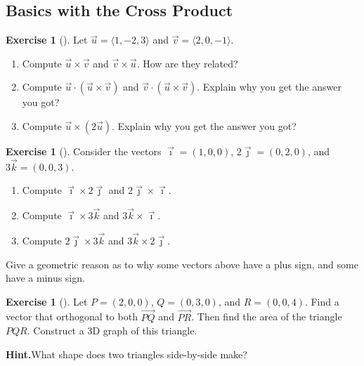 \documentclass[10pt,]{book}
\theoremstyle{plain}
\theoremstyle{definition}
\theoremstyle{definition}
\theoremstyle{definition}
\theoremstyle{definition}
\newtheorem{exploration}[project]{Exercise}
\theoremstyle{definition}
\numberwithin{equation}{section}
\newcommand{\ii}{\vec \imath}
\newcommand{\jj}{\vec \jmath}
\newcommand{\kk}{\vec k}
\begin{document}
\subsection[{Basics with the Cross Product}]{Basics with the Cross Product}\label{subsection-11}
\begin{exploration}[]\label{exploration-41}
Let \(\vec u=\langle 1,-2,3\rangle\) and \(\vec v=\langle 2,0,-1\rangle\).%
\begin{enumerate}[font=\bfseries,label=(\alph*),ref=\alph*]
\item\label{task-74} Compute \(\vec u\times \vec v\) and \(\vec v\times \vec u\).  How are they related?%
\item\label{task-75} Compute \(\vec u \cdot (\vec u\times \vec v)\) and \(\vec v \cdot (\vec u\times \vec v)\). Explain why you get the answer you got?%
\item\label{task-76} Compute \(\vec u \times (2\vec u)\).  Explain why you get the answer you got?%
\end{enumerate}
\end{exploration}
\begin{exploration}[]\label{exploration-42}
Consider the vectors \({\ii}=(1,0,0)\), \({2\jj}=(0,2,0)\), and \({3\kk}=(0,0,3)\).%
\begin{enumerate}[font=\bfseries,label=(\alph*),ref=\alph*]
\item\label{task-77} Compute \(\ii\times {2\jj}\) and \({2\jj}\times {\ii}\).%
\item\label{task-78} Compute \({\ii}\times {3\kk}\) and \({3\kk}\times {\ii}\).%
\item\label{task-79} Compute \({2\jj}\times {3\kk}\) and \({3\kk}\times {2\jj}\).%
\end{enumerate}
\bigbreak
Give a geometric reason as to why some vectors above have a plus sign, and some have a minus sign.%
\end{exploration}
\begin{exploration}[]\label{exploration-43}
Let \(P=(2,0,0)\), \(Q=(0,3,0)\), and \(R=(0,0,4)\). Find a vector that orthogonal to both \(\vec {PQ}\) and \(\vec {PR}\). Then find the area of the triangle \(PQR\). Construct a 3D graph of this triangle.%
\par\medskip\noindent%
\textbf{Hint.}\quad What shape does two triangles side-by-side make?%
\end{exploration}
\typeout{************************************************}
\typeout{************************************************}
\end{document}
